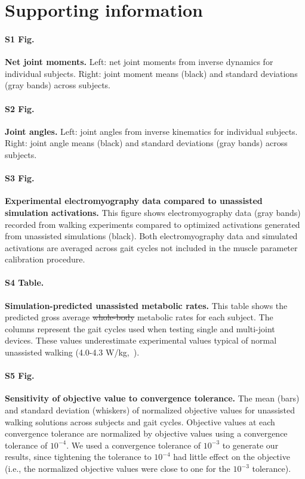 \documentclass[10pt,letterpaper]{article}
\providecommand{\DIFaddtex}[1]{{\protect\color{blue}\uwave{#1}}} %
\providecommand{\DIFdeltex}[1]{{\protect\color{red}\sout{#1}}}                      %
\providecommand{\DIFaddbegin}{} %
\providecommand{\DIFaddend}{} %
\providecommand{\DIFdelbegin}{} %
\providecommand{\DIFdelend}{} %
\providecommand{\DIFadd}[1]{\texorpdfstring{\DIFaddtex{#1}}{#1}} %
\providecommand{\DIFdel}[1]{\texorpdfstring{\DIFdeltex{#1}}{}} %
\newcommand{\DIFscaledelfig}{0.5}
\newlength{\DIFdelgraphicswidth} %
\newlength{\DIFdelgraphicsheight} %
\newcommand{\DIFaddincludegraphics}[2][]{{\color{blue}\fbox{\DIFOincludegraphics[#1]{#2}}}} %
\newcommand{\DIFdelincludegraphics}[2][]{%
\sbox{\DIFdelgraphicsbox}{\DIFOincludegraphics[#1]{#2}}%
\settoboxwidth{\DIFdelgraphicswidth}{\DIFdelgraphicsbox} %
\settoboxtotalheight{\DIFdelgraphicsheight}{\DIFdelgraphicsbox} %
\scalebox{\DIFscaledelfig}{%
\parbox[b]{\DIFdelgraphicswidth}{\usebox{\DIFdelgraphicsbox}\\[-\baselineskip] \rule{\DIFdelgraphicswidth}{0em}}\llap{\resizebox{\DIFdelgraphicswidth}{\DIFdelgraphicsheight}{%
\setlength{\unitlength}{\DIFdelgraphicswidth}%
\begin{picture}(1,1)%
\thicklines\linethickness{2pt} %
{\color[rgb]{1,0,0}\put(0,0){\framebox(1,1){}}}%
{\color[rgb]{1,0,0}\put(0,0){\line( 1,1){1}}}%
{\color[rgb]{1,0,0}\put(0,1){\line(1,-1){1}}}%
\end{picture}%
}\hspace*{3pt}}} %
} %
\DeclareRobustCommand{\DIFaddbegin}{\DIFOaddbegin \let\includegraphics\DIFaddincludegraphics} %
\DeclareRobustCommand{\DIFaddend}{\DIFOaddend \let\includegraphics\DIFOincludegraphics} %
\DeclareRobustCommand{\DIFdelbegin}{\DIFOdelbegin \let\includegraphics\DIFdelincludegraphics} %
\DeclareRobustCommand{\DIFdelend}{\DIFOaddend \let\includegraphics\DIFOincludegraphics} %
\begin{document}
\section*{Supporting information}

\paragraph*{S1 Fig.}
\label{S1_Fig}
{\bf Net joint moments.} Left: net joint moments from inverse dynamics for individual subjects. Right: joint moment means (black) and standard deviations (gray bands) across subjects.

\paragraph*{S2 Fig.}
\label{S2_Fig}
{\bf Joint angles.} Left: joint angles from inverse kinematics for individual subjects. Right: joint angle means (black) and standard deviations (gray bands) across subjects.

\paragraph*{S3 Fig.}
\label{S3_Fig}
{\bf Experimental electromyography data compared to unassisted simulation activations.} This figure shows electromyography data (gray bands) recorded from walking experiments compared to optimized activations generated from unassisted simulations (black). Both electromyography data and simulated activations are averaged across gait cycles not included in the muscle parameter calibration procedure.

\paragraph*{S4 Table.}
\label{S4_Table}
{\bf Simulation-predicted unassisted metabolic rates.} This table shows the predicted gross average \DIFdelbegin \DIFdel{whole-body }\DIFdelend \DIFaddbegin \DIFadd{total }\DIFaddend metabolic rates for each subject. The columns represent the gait cycles used when testing single and multi-joint devices. These values underestimate experimental values typical of normal unassisted walking (4.0-4.3 W/kg,~\cite{Waters:1999}).

\paragraph*{S5 Fig.}
\label{S5_Fig}
{\bf Sensitivity of objective value to convergence tolerance.} The mean (bars) and standard deviation (whiskers) of normalized objective values for unassisted walking solutions across subjects and gait cycles. Objective values at each convergence tolerance are normalized by objective values using a convergence tolerance of $10^{-4}$. We used a convergence tolerance of $10^{-3}$ to generate our results, since tightening the tolerance to $10^{-4}$ had little effect on the objective (i.e., the normalized objective values were close to one for the $10^{-3}$ tolerance).
\end{document}

